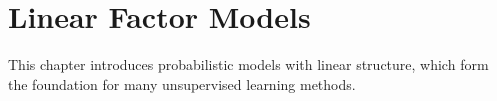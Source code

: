 
\chapter{Linear Factor Models}
\label{chap:linear-factor-models}

This chapter introduces probabilistic models with linear structure, which form the foundation for many unsupervised learning methods.






